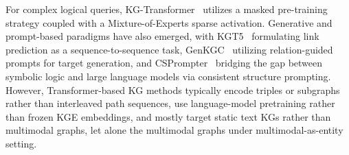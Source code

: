 \documentclass[runningheads]{llncs}
\begin{document}
For complex logical queries, KG-Transformer~\cite{liu2022mask} utilizes a masked pre-training strategy coupled with a Mixture-of-Experts sparse activation. Generative and prompt-based paradigms have also emerged, with KGT5~\cite{saxena2022kgt5} formulating link prediction as a sequence-to-sequence task, GenKGC~\cite{zhu2022genkgc} utilizing relation-guided prompts for target generation, and CSPrompter~\cite{chen2023csprompter} bridging the gap between symbolic logic and large language models via consistent structure prompting. However, Transformer-based KG methods typically encode triples or subgraphs rather than interleaved path sequences, use language-model pretraining rather than frozen KGE embeddings, and mostly target static text KGs rather than multimodal graphs, let alone the multimodal graphs under multimodal-as-entity setting.



\end{document}
